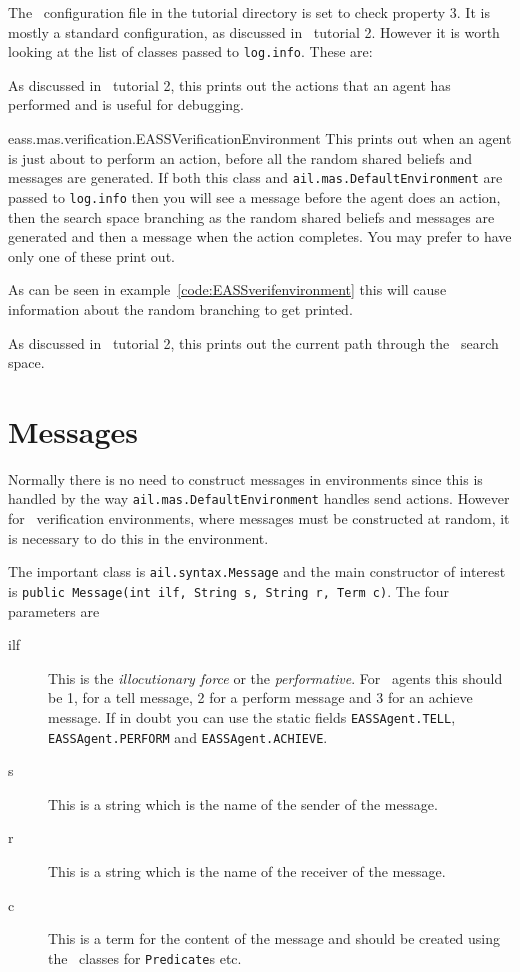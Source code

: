 The \jpf\ configuration file in the tutorial directory is set to check property 3.  It is mostly a standard configuration, as discussed in \ajpf\ tutorial 2.  However it is worth looking at the list of classes passed to \texttt{log.info}.  These are:
\begin{description}
\item[ail.mas.DefaultEnvironment] As discussed in \ajpf\ tutorial 2, this prints out the actions that an agent has performed and is useful for debugging.
\begin{sloppypar}
\item[eass.mas.verification.EASSVerificationEnvironment] This prints out when an agent is just about to perform an action, before all the random shared beliefs and messages are generated.  If both this class and \texttt{ail.mas.DefaultEnvironment} are passed to \texttt{log.info} then you will see a message before the agent does an action, then the search space branching as the random shared beliefs and messages are generated and then a message when the action completes.  You may prefer to have only one of these print out.
\end{sloppypar}
\item[eass.tutorials.tutorial3.VerificationEnvironment] As can be seen in example~\ref{code:EASSverifenvironment} this will cause information about the random branching to get printed.
\item[ajpf.product.Product] As discussed in \ajpf\ tutorial 2, this prints out the current path through the \ajpf\ search space.
\end{description}

\section{Messages}
Normally there is no need to construct messages in environments since this is handled by the way \texttt{ail.mas.DefaultEnvironment} handles send actions.  However for \eass\ verification environments, where messages must be constructed at random, it is necessary to do this in the environment.

The important class is \texttt{ail.syntax.Message} and the main constructor of interest is \texttt{public Message(int ilf, String s, String r, Term c)}.  The four parameters are
\begin{description}
\item[ilf] This is the \emph{illocutionary force} or the \emph{performative}.  For \eass\ agents this should be 1, for a tell message, 2 for a perform message and 3 for an achieve message.  If in doubt you can use the static fields \texttt{EASSAgent.TELL}, \texttt{EASSAgent.PERFORM} and \texttt{EASSAgent.ACHIEVE}.
\item[s] This is a string which is the name of the sender of the message.
\item[r] This is a string which is the name of the receiver of the message.
\item[c] This is a term for the content of the message and should be created using the \ail\ classes for \texttt{Predicate}s etc.
\end{description}

